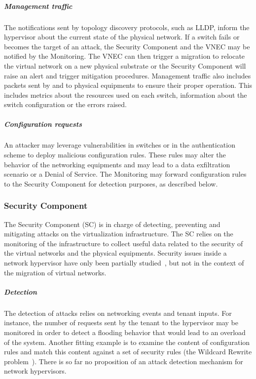 \subparagraph{Management traffic} 
The notifications sent by topology discovery protocols, such as LLDP, inform the hypervisor about the current state of the physical network. If a switch fails or becomes the target of an attack, the Security Component and the VNEC may be notified by the Monitoring.
The VNEC can then trigger a migration to relocate the virtual network on a new physical substrate or the Security Component will raise an alert and trigger mitigation procedures.
Management traffic also includes packets sent by and to physical equipments to ensure their proper operation.
This includes metrics about the resources used on each switch, information about the switch configuration or the errors raised.

\subparagraph{Configuration requests} An attacker may leverage vulnerabilities in switches or in the authentication scheme to deploy malicious configuration rules. These rules may alter the behavior of the networking equipments and may lead to a data exfiltration scenario or a Denial of Service.
The Monitoring may forward configuration rules to the Security Component for detection purposes, as described below.

\subsubsection{Security Component}
The Security Component (SC) is in charge of detecting, preventing and mitigating attacks on the virtualization infrastructure. The SC relies on the monitoring of the infrastructure to collect useful data related to the security of the virtual networks and the physical equipments.
Security issues inside a network hypervisor have only been partially studied~\cite{Costa2015}, but not in the context of the migration of virtual networks.

\subparagraph{Detection}
The detection of attacks relies on networking events and tenant inputs.
For instance, the number of requests sent by the tenant to the hypervisor may be monitored in order to detect a flooding behavior that would lead to an overload of the system. Another fitting example is to examine the content of configuration rules and match this content against a set of security rules (\eg the Wildcard Rewrite problem~\cite{Costa2015}).
There is so far no proposition of an attack detection mechanism for network hypervisors.

